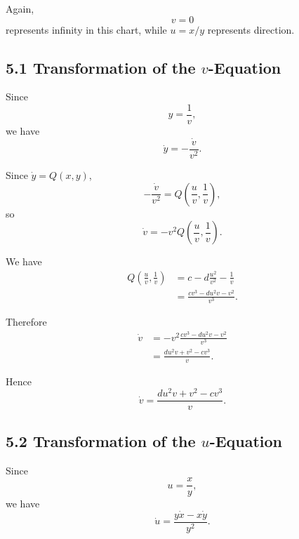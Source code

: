 \documentclass[11pt,a4paper]{article}
\begin{document}
Again,
\begin{equation}
v=0
\end{equation}
represents infinity in this chart, while $u=x/y$ represents
direction.

\subsection{5.1 Transformation of the $v$-Equation}

Since
\begin{equation}
y=\frac1v,
\end{equation}
we have
\begin{equation}
\dot y=-\frac{\dot v}{v^2}.
\end{equation}

Since $\dot y=Q(x,y)$,
\begin{equation}
-\frac{\dot v}{v^2}
=
Q\left(\frac{u}{v},\frac1v\right),
\end{equation}
so
\begin{equation}
\boxed{
\dot v
=
-v^2Q\left(\frac{u}{v},\frac1v\right).
}
\tag{32}
\end{equation}

We have
\begin{align}
Q\left(\frac{u}{v},\frac1v\right)
&=
c-d\frac{u^2}{v^2}-\frac1v\\
&=
\frac{cv^3-du^2v-v^2}{v^3}.
\end{align}

Therefore
\begin{align}
\dot v
&=
-v^2
\frac{cv^3-du^2v-v^2}{v^3}\\
&=
\frac{du^2v+v^2-cv^3}{v}.
\end{align}

Hence
\begin{equation}
\boxed{
\dot v
=
\frac{du^2v+v^2-cv^3}{v}.
}
\tag{33}
\end{equation}

\subsection{5.2 Transformation of the $u$-Equation}

Since
\begin{equation}
u=\frac{x}{y},
\end{equation}
we have
\begin{equation}
\dot u
=
\frac{y\dot x-x\dot y}{y^2}.
\end{equation}
\end{document}
